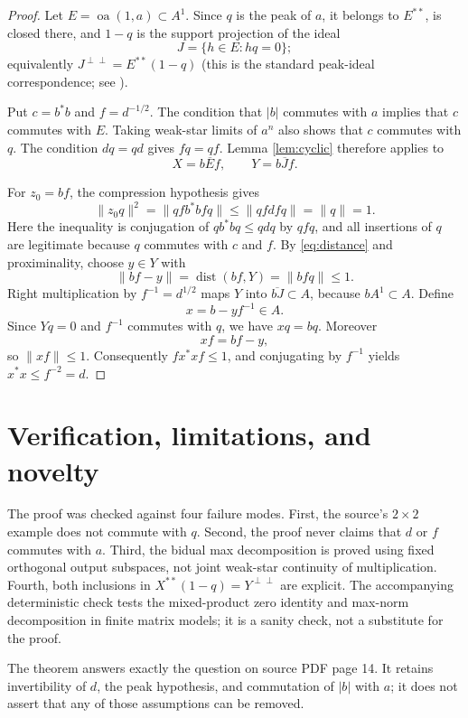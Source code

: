 \documentclass[11pt]{article}
\newcommand{\oa}{\operatorname{oa}}
\begin{document}
\begin{proof}
Let $E=\oa(1,a)\subset A^1$.  Since $q$ is the peak of $a$, it belongs to
$E^{**}$, is closed there, and $1-q$ is the support projection of the ideal
\[
 J=\{h\in E:hq=0\};
\]
equivalently $J^{\perp\perp}=E^{**}(1-q)$ (this is the standard peak-ideal
correspondence; see \cite{Hay,BRII}).

Put $c=b^*b$ and $f=d^{-1/2}$.  The condition that $|b|$ commutes with $a$
implies that $c$ commutes with $E$.  Taking weak-star limits of $a^n$ also
shows that $c$ commutes with $q$.  The condition $dq=qd$ gives $fq=qf$.
Lemma \ref{lem:cyclic} therefore applies to
\[
 X=\overline{bEf},\qquad Y=\overline{bJf}.
\]

For $z_0=bf$, the compression hypothesis gives
\[
 \|z_0q\|^2
 =\|qfb^*bfq\|
 \le \|qfd f q\|=\|q\|=1.
\]
Here the inequality is conjugation of $qb^*bq\le qdq$ by $qfq$, and all
insertions of $q$ are legitimate because $q$ commutes with $c$ and $f$.
By \eqref{eq:distance} and proximinality, choose $y\in Y$ with
\[
 \|bf-y\|=\operatorname{dist}(bf,Y)=\|bfq\|\le1.
\]
Right multiplication by $f^{-1}=d^{1/2}$ maps $Y$ into
$\overline{bJ}\subset A$, because $bA^1\subset A$.  Define
\[
 x=b-yf^{-1}\in A.
\]
Since $Yq=0$ and $f^{-1}$ commutes with $q$, we have $xq=bq$.  Moreover
\[
 xf=bf-y,
\]
so $\|xf\|\le1$.  Consequently
$f x^*x f\le1$, and conjugating by $f^{-1}$ yields $x^*x\le f^{-2}=d$.
\end{proof}

\section{Verification, limitations, and novelty}

The proof was checked against four failure modes.  First, the source's
$2\times2$ example does not commute with $q$.  Second, the proof never claims
that $d$ or $f$ commutes with $a$.  Third, the bidual max decomposition is
proved using fixed orthogonal output subspaces, not joint weak-star
continuity of multiplication.  Fourth, both inclusions in
$X^{**}(1-q)=Y^{\perp\perp}$ are explicit.  The accompanying deterministic
check tests the mixed-product zero identity and max-norm decomposition in
finite matrix models; it is a sanity check, not a substitute for the proof.

The theorem answers exactly the question on source PDF page 14.  It retains
invertibility of $d$, the peak hypothesis, and commutation of $|b|$ with $a$;
it does not assert that any of those assumptions can be removed.
\end{document}
